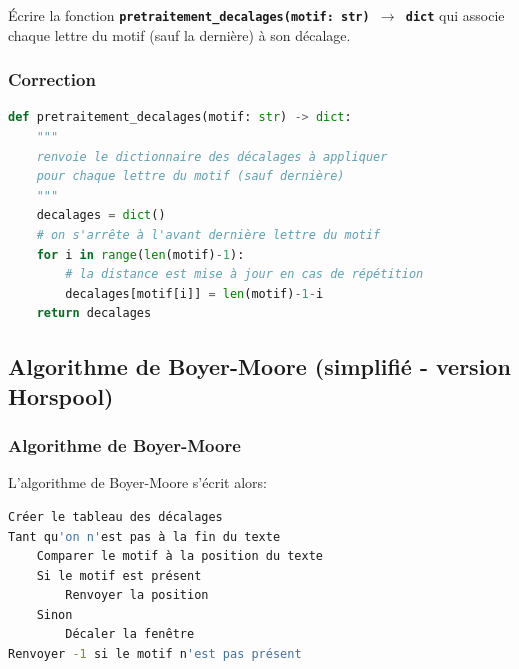 \documentclass[svgnames,11pt]{beamer}
\begin{document}
\begin{frame}
    \frametitle{}

    \begin{activite}
        Écrire la fonction \textbf{\texttt{pretraitement\_decalages(motif: str) $\rightarrow$ dict}} qui associe chaque lettre du motif (sauf la dernière) à son décalage.
    \end{activite}

\end{frame}
\begin{frame}[fragile]
    \frametitle{Correction}

\begin{center}
\begin{lstlisting}[language=Python , basicstyle=\ttfamily\small, xleftmargin=0.2em, xrightmargin=0em]
def pretraitement_decalages(motif: str) -> dict:
    """
    renvoie le dictionnaire des décalages à appliquer
    pour chaque lettre du motif (sauf dernière)
    """
    decalages = dict()
    # on s'arrête à l'avant dernière lettre du motif
    for i in range(len(motif)-1):
        # la distance est mise à jour en cas de répétition
        decalages[motif[i]] = len(motif)-1-i
    return decalages
\end{lstlisting}
\end{center}

\end{frame}
\subsection{Algorithme de Boyer-Moore (simplifié - version Horspool)}
\begin{frame}[fragile]
    \frametitle{Algorithme de Boyer-Moore}


    L'algorithme de Boyer-Moore s'écrit alors:
\begin{center}
\begin{lstlisting}[language=Bash, basicstyle=\small\ttfamily, xleftmargin=2em, xrightmargin=2em]
Créer le tableau des décalages
Tant qu'on n'est pas à la fin du texte
    Comparer le motif à la position du texte
    Si le motif est présent
        Renvoyer la position
    Sinon
        Décaler la fenêtre
Renvoyer -1 si le motif n'est pas présent
\end{lstlisting}
\label{algo}
\end{center}
\end{frame}
\end{document}
